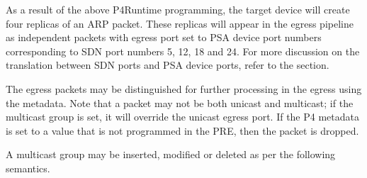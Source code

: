 \documentclass[11pt]{article}
\begin{document}
{%
\noindent{}As a result of the above P4Runtime programming, the target device will create
four replicas of an ARP packet. These replicas will appear in the egress
pipeline as independent packets with egress port set to PSA device port numbers
corresponding to SDN port numbers 5, 12, 18 and 24. For more discussion on the
translation between SDN ports and PSA device ports, refer to the
 section.%

The egress packets may be distinguished for further processing in the egress
using the  metadata. Note that a packet may not be both unicast and
multicast; if the multicast group is set, it will override the unicast egress
port. If the P4  metadata is set to a value that is not
programmed in the PRE, then the packet is dropped.%

A multicast group may be inserted, modified or deleted as per the following
semantics.%

\begin{itemize}[noitemsep,topsep=\mdcompacttopsep]%


\end{itemize}}
\end{document}
